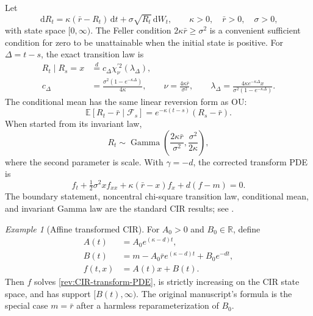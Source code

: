 \documentclass[11pt]{article}
\theoremstyle{remark}
\newtheorem{example}[definition]{Example}
\newcommand{\E}{\mathbb E}
\newcommand{\R}{\mathbb R}
\newcommand{\dd}{\,\mathrm d}
\newcommand{\Gam}{\operatorname{Gamma}}
\begin{document}
Let
\begin{equation}
\dd R_t=\kappa(\bar r-R_t)\dd t+\sigma\sqrt{R_t}\dd W_t,
\qquad \kappa>0,\quad\bar r>0,\quad\sigma>0,
\label{rev:CIR}
\end{equation}
with state space $[0,\infty)$.  The Feller condition
$2\kappa\bar r\ge\sigma^2$ is a convenient sufficient condition for zero to be
unattainable when the initial state is positive.  For $\Delta=t-s$, the exact
transition law is
\begin{align}
R_t\mid R_s=x&\overset d=c_\Delta
\chi^{\prime 2}_{\nu}(\lambda_\Delta),\label{rev:CIR-transition}\\
c_\Delta&=\frac{\sigma^2(1-e^{-\kappa\Delta})}{4\kappa},
\qquad
\nu=\frac{4\kappa\bar r}{\sigma^2},
\qquad
\lambda_\Delta=
\frac{4\kappa e^{-\kappa\Delta}x}
{\sigma^2(1-e^{-\kappa\Delta})}.
\end{align}
The conditional mean has the same linear reversion form as OU:
\begin{equation}
\E[R_t-\bar r\mid\mathcal F_s]
=e^{-\kappa(t-s)}(R_s-\bar r).
\label{rev:CIR-conditional-mean}
\end{equation}
When started from its invariant law,
\begin{equation}
R_t\sim\Gam\!\left(\frac{2\kappa\bar r}{\sigma^2},
                    \frac{\sigma^2}{2\kappa}\right),
\label{rev:CIR-stationary}
\end{equation}
where the second parameter is scale.  With $\gamma=-d$, the corrected
transform PDE is
\begin{equation}
f_t+\tfrac12\sigma^2x f_{xx}
+\kappa(\bar r-x)f_x+d(f-m)=0.
\label{rev:CIR-transform-PDE}
\end{equation}
The boundary statement, noncentral chi-square transition law, conditional mean,
and invariant Gamma law are the standard CIR results; see
\citet{CoxIngersollRoss1985}.

\begin{example}[Affine transformed CIR]
\label{rev:ex-affine-CIR}
For $A_0>0$ and $B_0\in\R$, define
\begin{align}
A(t)&=A_0e^{(\kappa-d)t},\label{rev:affine-CIR-A}\\
B(t)&=m-A_0\bar r e^{(\kappa-d)t}+B_0e^{-dt},
\label{rev:affine-CIR-B}\\
f(t,x)&=A(t)x+B(t).
\label{rev:affine-CIR-transform}
\end{align}
Then $f$ solves \eqref{rev:CIR-transform-PDE}, is strictly increasing on the
CIR state space, and has support $[B(t),\infty)$.  The original manuscript's
formula is the special case $m=\bar r$ after a harmless reparameterization of
$B_0$.
\end{example}
\end{document}
